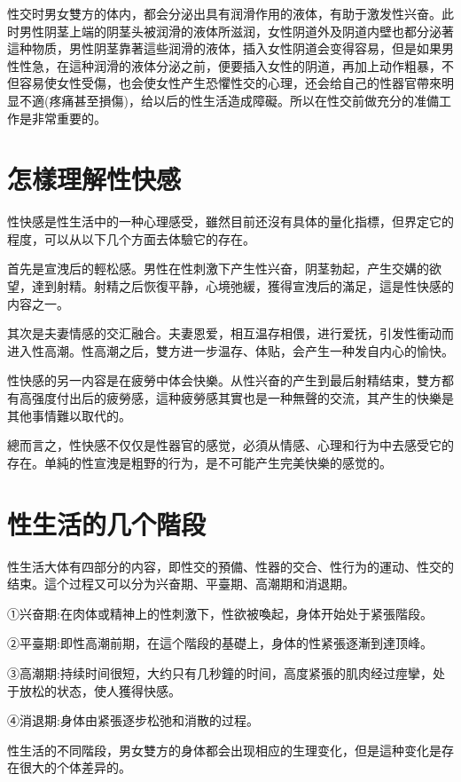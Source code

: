 \documentclass[12pt,UTF8]{ctexbook}
\begin{document}
性交时男女雙方的体内，都会分泌出具有润滑作用的液体，有助于激发性兴奋。此时男性阴茎上端的阴茎头被润滑的液体所滋润，女性阴道外及阴道内壁也都分泌著這种物质，男性阴茎靠著這些润滑的液体，插入女性阴道会变得容易，但是如果男性性急，在這种润滑的液体分泌之前，便要插入女性的阴道，再加上动作粗暴，不但容易使女性受傷，也会使女性产生恐懼性交的心理，还会给自己的性器官帶來明显不適(疼痛甚至損傷)，给以后的性生活造成障礙。所以在性交前做充分的准備工作是非常重要的。

\section{怎樣理解性快感}

性快感是性生活中的一种心理感受，雖然目前还沒有具体的量化指標，但界定它的程度，可以从以下几个方面去体驗它的存在。

首先是宣洩后的輕松感。男性在性刺激下产生性兴奋，阴茎勃起，产生交媾的欲望，達到射精。射精之后恢復平静，心境弛緩，獲得宣洩后的滿足，這是性快感的内容之一。

其次是夫妻情感的交汇融合。夫妻恩爱，相互温存相偎，进行爱抚，引发性衝动而进入性高潮。性高潮之后，雙方进一步温存、体贴，会产生一种发自内心的愉快。

性快感的另一内容是在疲勞中体会快樂。从性兴奋的产生到最后射精结束，雙方都有高强度付出后的疲勞感，這种疲勞感其實也是一种無聲的交流，其产生的快樂是其他事情難以取代的。

總而言之，性快感不仅仅是性器官的感觉，必須从情感、心理和行为中去感受它的存在。单純的性宣洩是粗野的行为，是不可能产生完美快樂的感觉的。

\section{性生活的几个階段}

性生活大体有四部分的内容，即性交的預備、性器的交合、性行为的運动、性交的结束。這个过程又可以分为兴奋期、平臺期、高潮期和消退期。

①兴奋期:在肉体或精神上的性刺激下，性欲被喚起，身体开始处于紧張階段。

②平臺期:即性高潮前期，在這个階段的基礎上，身体的性紧張逐漸到達顶峰。

③高潮期:持续时间很短，大约只有几秒鐘的时间，高度紧張的肌肉经过痙攣，处于放松的状态，使人獲得快感。

④消退期:身体由紧張逐步松弛和消散的过程。

性生活的不同階段，男女雙方的身体都会出现相应的生理变化，但是這种变化是存在很大的个体差异的。
\end{document}
